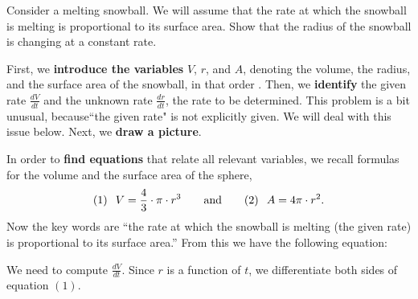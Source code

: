 \documentclass{ximera}
\begin{document}
\begin{example}
  Consider a melting snowball. We will assume that the rate at which the
  snowball is melting is proportional to its surface area. Show that
  the radius of the snowball is changing at a constant rate.
  
\begin{explanation}
First, we \textbf{introduce the variables} $V$, $r$, and $A$, denoting the volume, the radius, and the surface area of the snowball, in that order . Then, we \textbf{identify} the given rate $\frac{dV}{dt}$  and the unknown rate $\frac{dr}{dt}$, the rate to be determined. This problem is a bit unusual, because``the given  rate" is not explicitly given. We will deal with this issue below. 
  Next, we \textbf{draw a picture}.
  \begin{image}
  \end{image}
  In order to \textbf{find equations} that relate all relevant variables, we recall formulas for the  volume and the surface area of the sphere,
  \[
(1) \hspace{0.1in} V =\frac{4}{3} \cdot \pi \cdot r^3 \qquad\text{and}\qquad  (2) \hspace{0.1in} A = 4
  \pi \cdot r^2.
  \]
  Now the key words are ``the rate at which the snowball is melting (the given rate) is
  proportional to its surface area.'' From this we have the following
  equation:
  \begin{image}
  \end{image}
  We need to compute  $\frac{dV}{dt}$. Since $r$ is a function of $t$, we  differentiate both sides of equation $(1)$. 

\end{explanation}
\end{example}
\end{document}
